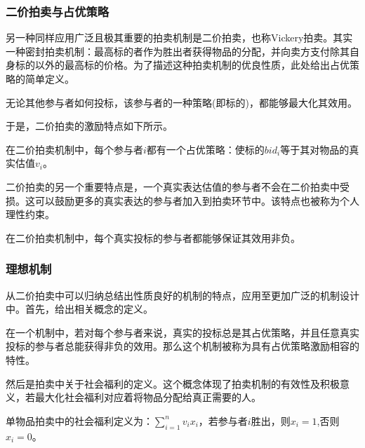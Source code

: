 \documentclass[promaster]{thesis-uestc}
\begin{document}
\subsubsection{二价拍卖与占优策略}
 另一种同样应用广泛且极其重要的拍卖机制是二价拍卖，也称Vickery拍卖。其实一种密封拍卖机制：最高标的者作为胜出者获得物品的分配，并向卖方支付除其自身标的以外的最高标的价格。为了描述这种拍卖机制的优良性质，此处给出占优策略的简单定义。
 \begin{definition}[占优策略]
     无论其他参与者如何投标，该参与者的一种策略(即标的)，都能够最大化其效用。
 \end{definition}
 于是，二价拍卖的激励特点如下所示。
 \begin{corollary}[二价拍卖中的激励]
     在二价拍卖机制中，每个参与者$i$都有一个占优策略：使标的$bid_i$等于其对物品的真实估值$v_i$。
 \end{corollary}
二价拍卖的另一个重要特点是，一个真实表达估值的参与者不会在二价拍卖中受损。这可以鼓励更多的真实表达的参与者加入到拍卖环节中。该特点也被称为个人理性约束。
\begin{corollary}[效用非负性]
    在二价拍卖机制中，每个真实投标的参与者都能够保证其效用非负。
\end{corollary}
\subsubsection{理想机制}
从二价拍卖中可以归纳总结出性质良好的机制的特点，应用至更加广泛的机制设计中。首先，给出相关概念的定义。
\begin{definition}
    在一个机制中，若对每个参与者来说，真实的投标总是其占优策略，并且任意真实投标的参与者总能获得非负的效用。那么这个机制被称为具有占优策略激励相容的特性。
\end{definition}

然后是拍卖中关于社会福利的定义。这个概念体现了拍卖机制的有效性及积极意义，若最大化社会福利对应着将物品分配给真正需要的人。
\begin{definition}[社会福利]
    单物品拍卖中的社会福利定义为：$\sum_{i=1}^{n}{v_ix_i}$，若参与者$i$胜出，则$x_i=1$,否则$x_i=0$。
\end{definition}
\end{document}
